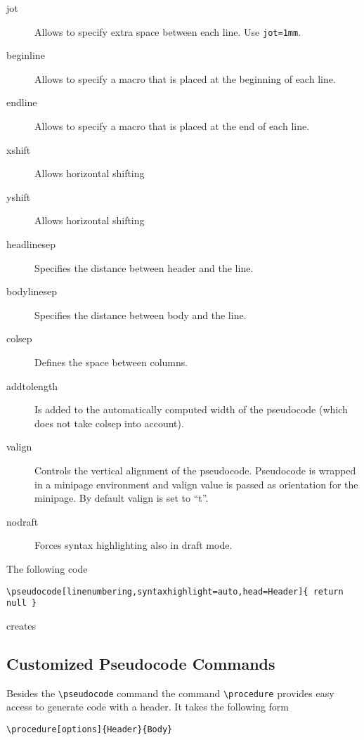\documentclass[a4paper]{report}
\begin{document}
\begin{description}
\item[jot]
Allows to specify extra space between each line. Use \lstinline$jot=1mm$.

\item[beginline]
Allows to specify a macro that is placed at the beginning of each line.

\item[endline]
Allows to specify a macro that is placed at the end of each line.

\item[xshift]
Allows horizontal shifting
\item[yshift]
Allows horizontal shifting

\item[headlinesep]
Specifies the distance between header and the line.
\item[bodylinesep]
Specifies the distance between body and the line.
\item[colsep]
Defines the space between columns.
\item[addtolength]
Is added to the automatically computed width of the pseudocode (which does not take colsep into account).

\item[valign]
Controls the vertical alignment of the pseudocode. Pseudocode is wrapped in a minipage environment and valign value is passed as orientation for the minipage. By default valign is set to \enquote{t}.

\item[nodraft]
Forces syntax highlighting also in draft mode.
\end{description}
The following code
\begin{lstlisting}
\pseudocode[linenumbering,syntaxhighlight=auto,head=Header]{ return null }
\end{lstlisting}
creates
\begin{center}
\end{center}

\subsection{Customized Pseudocode Commands}

Besides the  \lstinline{\pseudocode}  command the command  \lstinline{\procedure}
provides easy access to generate code with a header. It takes the following form
\begin{lstlisting}
\procedure[options]{Header}{Body}
\end{lstlisting}
\end{document}
